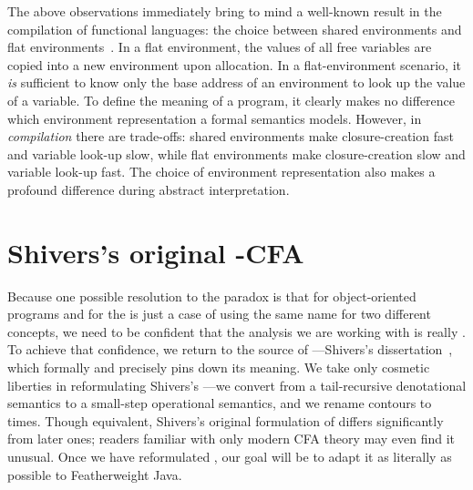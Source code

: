 The above observations immediately bring to mind a well-known result
in the compilation of functional languages: the choice between shared
environments and flat environments~\cite[page
  142]{dvanhorn:Appel1991Compiling}.
In a flat environment, the values of all free variables are copied
into a new environment upon allocation.
In a flat-environment scenario, it \emph{is} sufficient to know only
the base address of an environment to look up the value of a variable.
To define the meaning of a program, it clearly makes no difference which
environment representation a formal semantics models.
However, in \emph{compilation} there are trade-offs: shared
environments make closure-creation fast and variable look-up slow,
while flat environments make closure-creation slow and variable
look-up fast.
The choice of environment representation also makes a profound
difference during abstract interpretation.


























\section{Shivers's original -CFA}
\label{sec:kcfa-cps}

Because one possible resolution to the paradox is
that \kCFA{} for object-oriented programs and \kCFA{} for the \lc{} is
just a case of using the same name for two different concepts, we need
to be confident that the analysis we are working with is really
\kCFA.
To achieve that confidence, we return to the source of
\kCFA---Shivers's dissertation~\cite{mattmight:Shivers:1991:CFA},
which formally and precisely pins down its meaning.
We take only cosmetic liberties in reformulating Shivers's \kCFA---we
convert from a tail-recursive denotational semantics to a small-step
operational semantics, and we rename contours to times.
Though equivalent, Shivers's original formulation of \kCFA{} differs
significantly from later ones; readers familiar with only
modern CFA theory may even find it unusual.
Once we have reformulated \kCFA, our goal will be to adapt it as
literally as possible to Featherweight Java.





